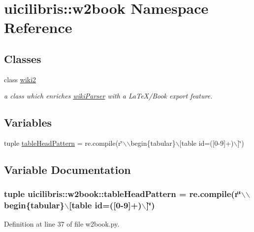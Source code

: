 \hypertarget{namespaceuicilibris_1_1w2book}{\section{uicilibris\-:\-:w2book \-Namespace \-Reference}
\label{namespaceuicilibris_1_1w2book}
}
\subsection*{\-Classes}
\begin{DoxyCompactItemize}
\item 
class \hyperlink{classuicilibris_1_1w2book_1_1wiki2}{wiki2}
\begin{DoxyCompactList}\small\item\em a class which enriches \hyperlink{namespaceuicilibris_1_1wikiParser}{wiki\-Parser} with a \-La\-Te\-X/\-Book export feature. \end{DoxyCompactList}\end{DoxyCompactItemize}
\subsection*{\-Variables}
\begin{DoxyCompactItemize}
\item 
tuple \hyperlink{namespaceuicilibris_1_1w2book_adac20372d98de9cb7596a3b5672dff64}{table\-Head\-Pattern} = re.\-compile(r\char`\"{}$\backslash$$\backslash$begin\{tabular\}$\backslash$\mbox{[}table id=(\mbox{[}0-\/9\mbox{]}+)$\backslash$\mbox{]}\char`\"{})
\end{DoxyCompactItemize}


\subsection{\-Variable \-Documentation}
\hypertarget{namespaceuicilibris_1_1w2book_adac20372d98de9cb7596a3b5672dff64}{
\subsubsection[{table\-Head\-Pattern}]{\setlength{\rightskip}{0pt plus 5cm}tuple {\bf uicilibris\-::w2book\-::table\-Head\-Pattern} = re.\-compile(r\char`\"{}$\backslash$$\backslash$begin\{tabular\}$\backslash$\mbox{[}table id=(\mbox{[}0-\/9\mbox{]}+)$\backslash$\mbox{]}\char`\"{})}}\label{namespaceuicilibris_1_1w2book_adac20372d98de9cb7596a3b5672dff64}


\-Definition at line 37 of file w2book.\-py.

